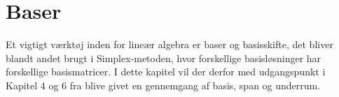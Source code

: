 \chapter{Baser}
Et vigtigt værktøj inden for lineær algebra er baser og basisskifte, det bliver blandt andet brugt i Simplex-metoden, hvor forskellige basisløsninger har forskellige basismatricer. 
I dette kapitel vil der derfor med udgangspunkt i Kapitel 4 og 6 fra \citet{lial}
blive givet en gennemgang af basis, span og underrum. \\





